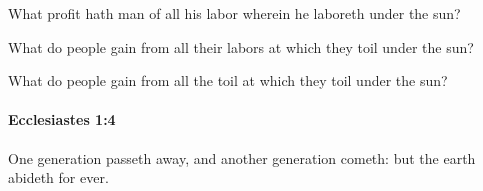			\begin{versebox}
					\item[BHS] 
					\item[LXX] 
					\item[ASV] What profit hath man of all his labor wherein he laboreth under the sun?
					\item[NIV] What do people gain from all their labors at which they toil under the sun?
					\item[NRSV] What do people gain from all the toil at which they toil under the sun?
			\end{versebox}

		\paragraph{Ecclesiastes 1:4} %
			\label{ECCLESIASTES-1-4}

			One generation passeth away, and another generation cometh: but the earth abideth for ever.

